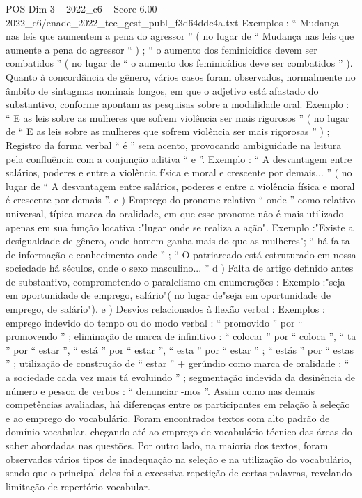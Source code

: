\begin{textsample}{POS Dim 3 – 2022\_c6 – Score 6.00 – 2022\_c6/enade\_2022\_tec\_gest\_publ\_f3d64ddc4a.txt}
Exemplos : “ Mudança nas leis que aumentem a pena do agressor ” ( no lugar de “ Mudança nas leis que aumente a pena do agressor “ ) ; “ o aumento dos feminicídios devem ser combatidos ” ( no lugar de “ o aumento dos feminicídios deve ser combatidos ” ).
Quanto à concordância de gênero, vários casos foram observados, normalmente no âmbito de sintagmas nominais longos, em que o adjetivo está afastado do substantivo, conforme apontam as pesquisas sobre a modalidade oral.
Exemplo : “ E as leis sobre as mulheres que sofrem violência ser mais rigorosos ” ( no lugar de “ E as leis sobre as mulheres que sofrem violência ser mais rigorosas ” ) ; Registro da forma verbal “ é ” sem acento, provocando ambiguidade na leitura pela confluência com a conjunção aditiva “ e ”.
Exemplo : “ A desvantagem entre salários, poderes e entre a violência física e moral e crescente por demais... ” ( no lugar de “ A desvantagem entre salários, poderes e entre a violência física e moral é crescente por demais ”. c ) Emprego do pronome relativo “ onde ” como relativo universal, típica marca da oralidade, em que esse pronome não é mais utilizado apenas em sua função locativa :"lugar onde se realiza a ação".
Exemplo :"Existe a desigualdade de gênero, onde homem ganha mais do que as mulheres"; “ há falta de informação e conhecimento onde ” ; “ O patriarcado está estruturado em nossa sociedade há séculos, onde o sexo masculino... ” d ) Falta de artigo definido antes de substantivo, comprometendo o paralelismo em enumerações : Exemplo :"seja em oportunidade de emprego, salário"( no lugar de"seja em oportunidade de emprego, de salário"). e ) Desvios relacionados à flexão verbal : Exemplos : emprego indevido do tempo ou do modo verbal : “ promovido ” por “ promovendo ” ; eliminação de marca de infinitivo : “ colocar ” por “ coloca ”, “ ta ” por “ estar ”, “ está ” por “ estar ”, “ esta ” por “ estar ” ; “ estás ” por “ estas ” ; utilização de construção de “ estar ” + gerúndio como marca de oralidade : “ a sociedade cada vez mais tá evoluindo ” ; segmentação indevida da desinência de número e pessoa de verbos : “ denunciar -mos ”.
Assim como nas demais competências avaliadas, há diferenças entre os participantes em relação à seleção e ao emprego do vocabulário.
Foram encontrados textos com alto padrão de domínio vocabular, chegando até ao emprego de vocabulário técnico das áreas do saber abordadas nas questões.
Por outro lado, na maioria dos textos, foram observados vários tipos de inadequação na seleção e na utilização do vocabulário, sendo que o principal deles foi a excessiva repetição de certas palavras, revelando limitação de repertório vocabular.

\end{textsample}
